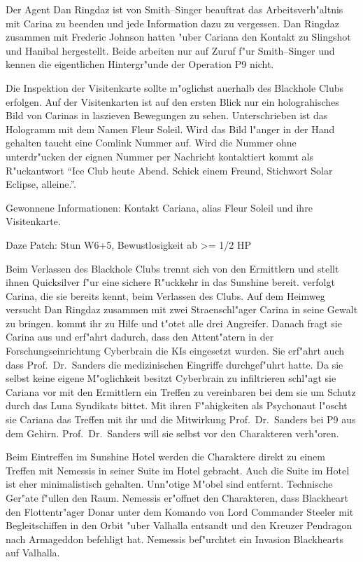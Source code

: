 Der Agent {\emph{}Dan Ringdaz} ist von Smith--Singer beauftrat das Arbeitsverh"altnis mit Carina zu beenden und jede Information dazu zu vergessen. Dan Ringdaz zusammen mit Frederic Johnson hatten "uber Cariana den Kontakt zu Slingshot und Hanibal hergestellt. Beide arbeiten nur auf Zuruf f"ur Smith--Singer und kennen die eigentlichen Hintergr"unde der Operation P9 nicht.

Die Inspektion der Visitenkarte sollte m"oglichst au\3erhalb des Blackhole Clubs erfolgen. Auf der Visitenkarten ist auf den ersten Blick nur ein holograhisches Bild von Carinas in laszieven Bewegungen zu sehen. Unterschrieben ist das Hologramm mit dem Namen Fleur Soleil. Wird das Bild l"anger in der Hand gehalten taucht eine Comlink Nummer auf. Wird die Nummer ohne unterdr"ucken der eignen Nummer per Nachricht kontaktiert kommt als R"uckantwort "`Ice Club heute Abend. Schick einem Freund, Stichwort Solar Eclipse, alleine."'.

\begin{remarks}
	Gewonnene Informationen: Kontakt Cariana, alias Fleur Soleil und ihre Visitenkarte.

	Daze Patch: Stun W6+5, Bewustlosigkeit ab >= 1/2 HP
\end{remarks}



Beim Verlassen des Blackhole Clubs trennt sich \xl{} von den Ermittlern und stellt ihnen Quicksilver f"ur eine sichere R"uckkehr in das Sunshine bereit. \xl{} verfolgt Carina, die sie bereits kennt, beim Verlassen des Clubs. Auf dem Heimweg versucht Dan Ringdaz zusammen mit zwei Stra\3enschl"ager Carina in seine Gewalt zu bringen. \xl{} kommt ihr zu Hilfe und t"otet alle drei Angreifer. Danach fragt sie Carina aus und erf"ahrt dadurch, dass den Attent"atern in der Forschungseinrichtung Cyberbrain die KIs eingesetzt wurden. Sie erf"ahrt auch dass Prof.~Dr.~Sanders die medizinischen Eingriffe durchgef"uhrt hatte. Da sie selbst keine eigene M"oglichkeit besitzt Cyberbrain zu infiltrieren schl"agt sie Cariana vor mit den Ermittlern ein Treffen zu vereinbaren bei dem sie um Schutz durch das Luna Syndikats bittet. Mit ihren F"ahigkeiten als Psychonaut l"oscht sie Cariana das Treffen mit ihr und die Mitwirkung Prof.~Dr.~Sanders bei P9 aus dem Gehirn. Prof.~Dr.~Sanders will sie selbst vor den Charakteren verh"oren.

Beim Eintreffen im Sunshine Hotel werden die Charaktere direkt zu einem Treffen mit Nemessis in seiner Suite im Hotel gebracht. Auch die Suite im Hotel ist eher minimalistisch gehalten. Unn"otige M"obel sind entfernt. Technische Ger"ate f"ullen den Raum. Nemessis er"offnet den Charakteren, dass Blackheart den Flottentr"ager Donar unter dem Komando von Lord Commander Steeler mit Begleitschiffen in den Orbit "uber Valhalla entsandt und den Kreuzer Pendragon nach Armageddon befehligt hat. Nemessis bef"urchtet ein Invasion Blackhearts auf Valhalla.

